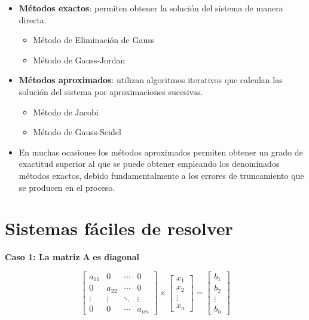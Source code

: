 \documentclass[openany]{book}
\providecommand{\tightlist}{%
  \setlength{\itemsep}{0pt}\setlength{\parskip}{0pt}}
\begin{document}
\begin{itemize}
\item
  \textbf{Métodos exactos}: permiten obtener la solución del sistema de manera directa.

  \begin{itemize}
  \tightlist
  \item
    Método de Eliminación de Gauss
  \item
    Método de Gauss-Jordan
  \end{itemize}
\item
  \textbf{Métodos aproximados}: utilizan algoritmos iterativos que calculan las solución del sistema por aproximaciones sucesivas.

  \begin{itemize}
  \tightlist
  \item
    Método de Jacobi
  \item
    Método de Gauss-Seidel
  \end{itemize}
\item
  En muchas ocasiones los métodos aproximados permiten obtener un grado de exactitud superior al que se puede obtener empleando los denominados métodos exactos, debido fundamentalmente a los errores de truncamiento que se producen en el proceso.
\end{itemize}

\hypertarget{sistemas-fuxe1ciles-de-resolver}{%
\section{Sistemas fáciles de resolver}\label{sistemas-fuxe1ciles-de-resolver}}

\textbf{Caso 1: La matriz} \(\mathbf{A}\) \textbf{es diagonal}

\[
\begin{bmatrix}
a_{11} & 0 & \cdots & 0 \\
0 & a_{22} & \cdots & 0 \\
\vdots & \vdots & \ddots & \vdots \\
0 & 0 & \cdots & a_{nn} 
\end{bmatrix}
\times 
\begin{bmatrix}
x_1 \\ x_2 \\ \vdots \\ x_n
\end{bmatrix}
=
\begin{bmatrix}
b_1 \\ b_2 \\ \vdots \\ b_n
\end{bmatrix}
\]
\end{document}
